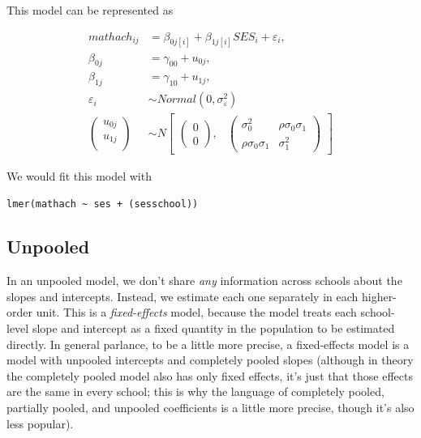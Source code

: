 \documentclass[
  letterpaper,
  DIV=11,
  numbers=noendperiod]{scrreprt}
\begin{document}
This model can be represented as

\[\begin{aligned}
mathach_{ij} &= \beta_{0j[i]} + \beta_{1j[i]}SES_i + \varepsilon_i, \\
    \beta_{0j} &= \gamma_{00} + u_{0j},\\
    \beta_{1j} &= \gamma_{10} + u_{1j},\\
    \varepsilon_i &\sim Normal(0, \sigma^2_\varepsilon) \\
    \begin{pmatrix}
        u_{0j}\\
        u_{1j}\\
    \end{pmatrix} &\sim  N
    \begin{bmatrix}
        \begin{pmatrix}
            0\\
            0
        \end{pmatrix}\!\!,&
        \begin{pmatrix}
            \sigma^2_0 & \rho\sigma_0\sigma_1\\
            \rho\sigma_0\sigma_1 & \sigma^2_1
        \end{pmatrix}
    \end{bmatrix}
\end{aligned}\]

We would fit this model with

\texttt{lmer(mathach\ \textasciitilde{}\ ses\ +\ (ses\textbar{}school))}

\hypertarget{unpooled}{%
\subsection{Unpooled}\label{unpooled}}

In an unpooled model, we don't share \emph{any} information across
schools about the slopes and intercepts. Instead, we estimate each one
separately in each higher-order unit. This is a \emph{fixed-effects}
model, because the model treats each school-level slope and intercept as
a fixed quantity in the population to be estimated directly. In general
parlance, to be a little more precise, a fixed-effects model is a model
with unpooled intercepts and completely pooled slopes (although in
theory the completely pooled model also has only fixed effects, it's
just that those effects are the same in every school; this is why the
language of completely pooled, partially pooled, and unpooled
coefficients is a little more precise, though it's also less popular).
\end{document}
